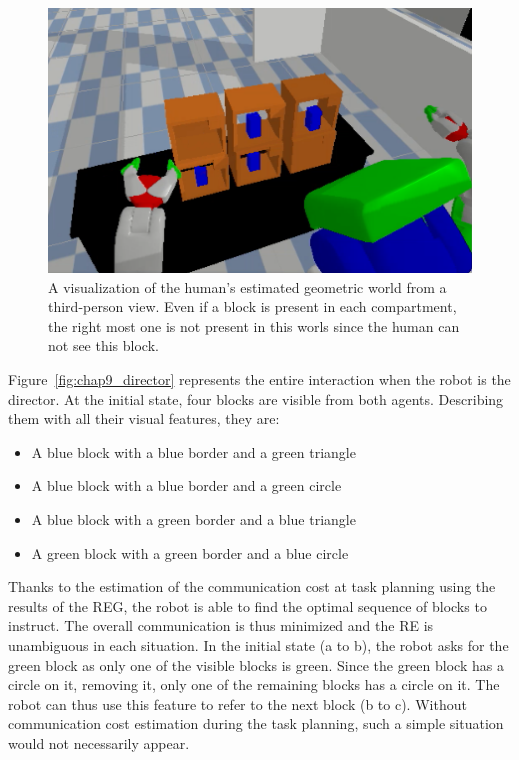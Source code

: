 \begin{figure}[ht!]
\centering
\includegraphics[scale=0.5]{figures/chapter9/robot_view.png}
\caption{\label{fig:chap9_robot_view} A visualization of the human's estimated geometric world from a third-person view. Even if a block is present in each compartment, the right most one is not present in this worls since the human can not see this block. }
\end{figure}

Figure~\ref{fig:chap9_director} represents the entire interaction when the robot is the director. At the initial state, four blocks are visible from both agents. Describing them with all their visual features, they are:

\begin{itemize}
  \item A blue block with a blue border and a green triangle
  \item A blue block with a blue border and a green circle
  \item A blue block with a green border and a blue triangle
  \item A green block with a green border and a blue circle
\end{itemize}

Thanks to the estimation of the communication cost at task planning using the results of the REG, the robot is able to find the optimal sequence of blocks to instruct. The overall communication is thus minimized and the RE is unambiguous in each situation. In the initial state (a to b), the robot asks for the green block as only one of the visible blocks is green. Since the green block has a circle on it, removing it, only one of the remaining blocks has a circle on it. The robot can thus use this feature to refer to the next block (b to c). Without communication cost estimation during the task planning, such a simple situation would not necessarily appear.

